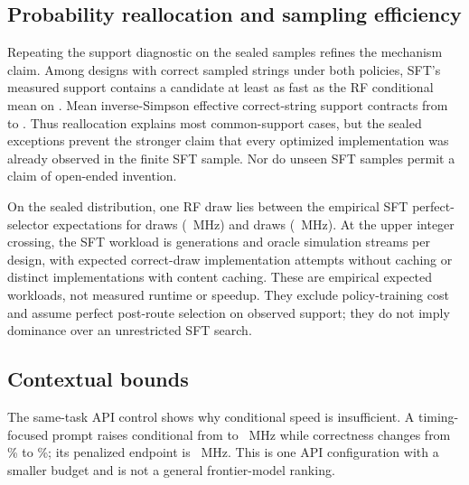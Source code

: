 \subsection{Probability reallocation and sampling efficiency}
\label{sec:mechanism}

Repeating the support diagnostic on the sealed samples refines the mechanism
claim.  Among  designs with
correct sampled strings under both policies, SFT's measured support contains a
candidate at least as fast as the RF conditional mean on
.  Mean inverse-Simpson
effective correct-string support contracts from
 to
.  Thus reallocation explains
most common-support cases, but the sealed exceptions prevent the stronger claim
that every optimized implementation was already observed in the finite SFT
sample.  Nor do unseen SFT samples permit a claim of open-ended invention.

On the sealed distribution, one RF draw lies between the empirical SFT
perfect-selector expectations for  draws
(~MHz) and
 draws
(~MHz).  At the upper integer crossing, the
SFT workload is  generations and
 oracle simulation streams per design, with
 expected correct-draw implementation
attempts without caching or 
distinct implementations with content caching.  These are empirical expected
workloads, not measured runtime or speedup.  They exclude policy-training cost
and assume perfect post-route selection on observed support; they do not imply
dominance over an unrestricted SFT search.

\subsection{Contextual bounds}

The same-task API control shows why conditional speed is insufficient.  A
timing-focused prompt raises conditional \fmax{} from
 to
~MHz while correctness changes from
\% to
\%; its penalized endpoint is
~MHz.  This is one API configuration with a smaller
budget and is not a general frontier-model ranking.

